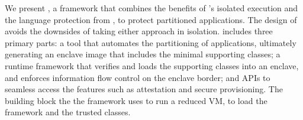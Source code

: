 {%

We present {\em \civet{}}, a framework that combines the benefits of
\sgx{}'s isolated execution and the language protection from \java{}, to protect partitioned applications.
The design of \civet{} avoids the downsides of taking either approach in isolation.
\civet{} includes three primary parts:
a tool that automates the partitioning of applications, ultimately generating an enclave image that includes
the minimal supporting classes;
a runtime framework that verifies and loads the supporting classes into an enclave, and enforces information flow control on the enclave border;
and \java{} APIs to seamless access the \sgx{} features such
as attestation and secure provisioning.
The building block the the \civet{} framework uses \gsgx{} to run a reduced \java{} VM, to load the framework and the trusted classes.
}

